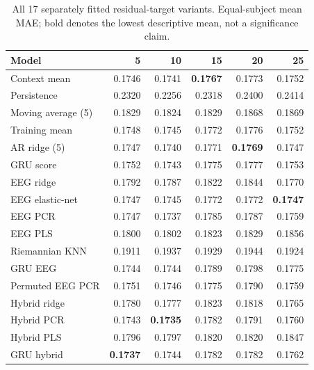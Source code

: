\begin{table}[!ht]
\centering
\small
\setlength{\tabcolsep}{5pt}
\renewcommand{\arraystretch}{1.1}
\caption{All 17 separately fitted residual-target variants. Equal-subject mean MAE; bold denotes the lowest descriptive mean, not a significance claim.}
\label{tab:supp_mae_residual}
\begin{tabular}{lrrrrr}
\toprule
Model & 5 & 10 & 15 & 20 & 25 \\
\midrule
Context mean & 0.1746 & 0.1741 & \textbf{0.1767} & 0.1773 & 0.1752 \\
Persistence & 0.2320 & 0.2256 & 0.2318 & 0.2400 & 0.2414 \\
Moving average (5) & 0.1829 & 0.1824 & 0.1829 & 0.1868 & 0.1869 \\
Training mean & 0.1748 & 0.1745 & 0.1772 & 0.1776 & 0.1752 \\
AR ridge (5) & 0.1747 & 0.1740 & 0.1771 & \textbf{0.1769} & 0.1747 \\
GRU score & 0.1752 & 0.1743 & 0.1775 & 0.1777 & 0.1753 \\
\midrule
EEG ridge & 0.1792 & 0.1787 & 0.1822 & 0.1844 & 0.1770 \\
EEG elastic-net & 0.1747 & 0.1745 & 0.1772 & 0.1772 & \textbf{0.1747} \\
EEG PCR & 0.1747 & 0.1737 & 0.1785 & 0.1787 & 0.1759 \\
EEG PLS & 0.1800 & 0.1802 & 0.1823 & 0.1829 & 0.1856 \\
Riemannian KNN & 0.1911 & 0.1937 & 0.1929 & 0.1944 & 0.1924 \\
GRU EEG & 0.1744 & 0.1744 & 0.1789 & 0.1798 & 0.1775 \\
Permuted EEG PCR & 0.1751 & 0.1746 & 0.1775 & 0.1790 & 0.1759 \\
\midrule
Hybrid ridge & 0.1780 & 0.1777 & 0.1823 & 0.1818 & 0.1765 \\
Hybrid PCR & 0.1743 & \textbf{0.1735} & 0.1782 & 0.1791 & 0.1760 \\
Hybrid PLS & 0.1796 & 0.1797 & 0.1820 & 0.1820 & 0.1847 \\
GRU hybrid & \textbf{0.1737} & 0.1744 & 0.1782 & 0.1782 & 0.1762 \\
\bottomrule
\end{tabular}
\end{table}
